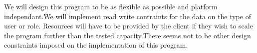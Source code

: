 
We will design this program to be as flexible as possible and platform independant.We will implement read
write contraints for the data on the type of user or role. Resources will have to be provided by the client if 
they wish to scale the program further than the tested capacity.There seems not to be other design constraints
imposed on the implementation of this program.
